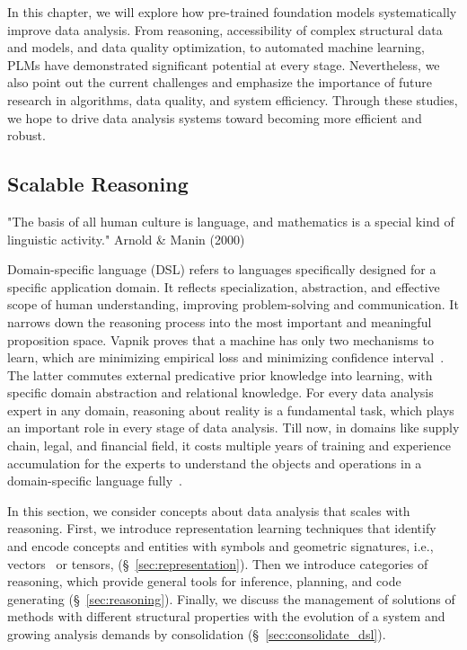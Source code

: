   In this chapter, we will explore how pre-trained foundation models systematically improve data analysis. From reasoning, accessibility of complex structural data and models, and data quality optimization, to automated machine learning, PLMs have demonstrated significant potential at every stage. Nevertheless, we also point out the current challenges and emphasize the importance of future research in algorithms, data quality, and system efficiency. Through these studies, we hope to drive data analysis systems toward becoming more efficient and robust.
  
  \subsection{Scalable Reasoning}\label{sec:dsl}
  
  "The basis of all human culture is language, and mathematics is a special kind of linguistic activity." Arnold \& Manin (2000)
  
Domain-specific language (DSL) refers to languages specifically designed for a specific application domain. It reflects specialization, abstraction, and effective scope of human understanding, improving problem-solving and communication. It narrows down the reasoning process into the most important and meaningful proposition space. Vapnik proves that a machine has only two mechanisms to learn, which are minimizing empirical loss and minimizing confidence interval~\cite{vapnik2019rethinking}. The latter commutes external predicative prior knowledge into learning, with specific domain abstraction and relational knowledge. For every data analysis expert in any domain, reasoning about reality is a fundamental task, which plays an important role in every stage of data analysis. Till now, in domains like supply chain, legal, and financial field, it costs multiple years of training and experience accumulation for the experts to understand the objects and operations in a domain-specific language fully~\cite{garcia2010using}. 
  
In this section, we consider concepts about data analysis that scales with reasoning. First, we introduce representation learning techniques that identify and encode concepts and entities with symbols and geometric signatures, i.e., vectors~\cite{TURL} or tensors, (\S~\ref{sec:representation}). Then we introduce categories of reasoning, which provide general tools for inference, planning, and code generating (\S~\ref{sec:reasoning}). Finally, we discuss the management of solutions of methods with different structural properties with the evolution of a system and growing analysis demands by consolidation (\S~\ref{sec:consolidate_dsl}).
  
